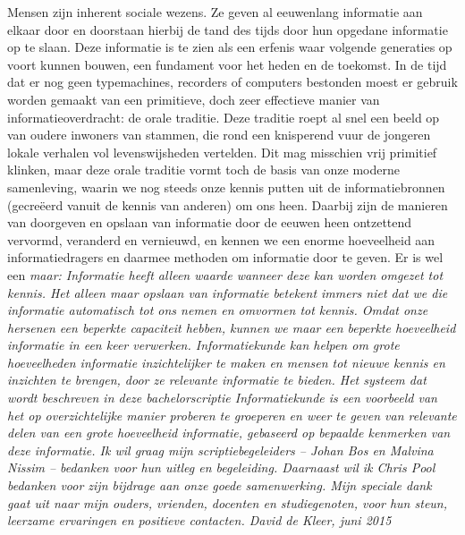 Mensen zijn inherent sociale wezens. Ze geven al eeuwenlang informatie aan 
elkaar door en doorstaan hierbij de tand des tijds door hun opgedane informatie 
op te slaan. Deze informatie is te zien als een erfenis waar volgende generaties 
op voort kunnen bouwen, een fundament voor het heden en de toekomst.
\vl
In de tijd dat er nog geen typemachines, recorders of computers bestonden moest 
er gebruik worden gemaakt van een primitieve, doch zeer effectieve manier van 
informatieoverdracht: de orale traditie. Deze traditie roept al snel een beeld 
op van oudere inwoners van stammen, die rond een knisperend vuur de jongeren 
lokale verhalen vol levenswijsheden vertelden. Dit mag misschien vrij primitief 
klinken, maar deze orale traditie vormt toch de basis van onze moderne 
samenleving, waarin we nog steeds onze kennis putten uit de informatiebronnen 
(gecreëerd vanuit de kennis van anderen) om ons heen. Daarbij zijn de manieren 
van doorgeven en opslaan van informatie door de eeuwen heen ontzettend vervormd, 
veranderd en vernieuwd, en kennen we een enorme hoeveelheid aan 
informatiedragers en daarmee methoden om informatie door te geven.
\vl
Er is wel een \it{maar}: Informatie heeft alleen waarde wanneer deze kan worden 
omgezet tot \it{kennis}. Het alleen maar opslaan van informatie betekent immers niet 
dat we die informatie automatisch tot ons nemen en omvormen tot kennis. Omdat 
onze hersenen een beperkte capaciteit hebben, kunnen we maar een beperkte 
hoeveelheid informatie in een keer verwerken. Informatiekunde kan helpen om 
grote hoeveelheden informatie inzichtelijker te maken en mensen tot nieuwe 
kennis en inzichten te brengen, door ze relevante informatie te bieden.
\vl
Het systeem dat wordt beschreven in deze bachelorscriptie Informatiekunde is een voorbeeld van het op 
overzichtelijke manier proberen te groeperen en weer te geven van relevante 
delen van een grote hoeveelheid informatie, gebaseerd op bepaalde kenmerken van 
deze informatie. 
\vl
Ik wil graag mijn scriptiebegeleiders – Johan Bos en Malvina Nissim – bedanken voor 
hun uitleg en begeleiding. Daarnaast wil ik Chris Pool bedanken voor zijn bijdrage
aan onze goede samenwerking. Mijn speciale dank gaat uit naar mijn ouders, vrienden, 
docenten en studiegenoten, voor hun steun, leerzame ervaringen en positieve contacten.
\vl
\it{David de Kleer, juni 2015}

\newpage
\null\vspace{\fill}

